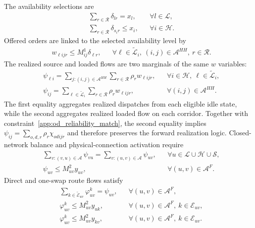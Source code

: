 \documentclass[final,3p,authoryear]{elsarticle}
\begin{document}
The availability selections are
\begin{align}
&
\sum_{r\in\mathcal R}\delta_{l r}
=x_l,
&&\forall l\in\mathcal L,
\label{app:availability_base}
\\
&
\sum_{r\in\mathcal R}\delta_{s_i r}
\le x_i,
&&\forall i\in\mathcal H.
\label{app:availability_virtual}
\end{align}
Offered orders are linked to the selected availability level by
\begin{align}
&
w_{\ell i j r}
\le M^1_{ij}\delta_{\ell r},
&&\forall \ell\in\widetilde{\mathcal L}_{i},\
(i,j)\in\mathcal A^{HH},\
r\in\mathcal R.
\label{app:w_reliability}
\end{align}
The realized source and loaded flows are two marginals of the same $w$ variables:
\begin{subequations}
\label{app:realized_flow_definitions}
\begin{align}
&
\psi_{\ell i}
=
\sum_{j:(i,j)\in\mathcal A^{HH}}
\sum_{r\in\mathcal R}
\rho_r w_{\ell i j r},
&&\forall i\in\mathcal H,\ \ell\in\widetilde{\mathcal L}_{i},
\label{app:source_flow}
\\
&
\psi_{ij}
=
\sum_{\ell\in\widetilde{\mathcal L}_{i}}
\sum_{r\in\mathcal R}
\rho_r w_{\ell i j r},
&&\forall(i,j)\in\mathcal A^{HH}.
\label{app:loaded_flow}
\end{align}
\end{subequations}
The first equality aggregates realized dispatches from each eligible idle state, while the second aggregates realized loaded flow on each corridor.
Together with constraint~\eqref{app:od_reliability_match}, the second equality implies $\psi_{ij}=\sum_{o,d,r}\rho_r\chi_{odijr}$ and therefore preserves the forward realization logic.
Closed-network balance and physical-connection activation require
\begin{align}
&
\sum_{v:(v,u)\in\mathcal A}\psi_{vu}
=
\sum_{v:(u,v)\in\mathcal A}\psi_{uv},
&&\forall u\in\mathcal L\cup\mathcal H\cup\mathcal S,
\label{app:flow_balance}
\\
&
\psi_{uv}
\le M^2_{uv}y_{uv},
&&\forall(u,v)\in\mathcal A^{F}.
\label{app:physical_flow}
\end{align}
Direct and one-swap route flows satisfy
\begin{align}
&
\sum_{k\in\widetilde{\mathcal E}_{uv}}
\varphi_{uv}^{k}
=\psi_{uv},
&&\forall(u,v)\in\mathcal A^{F},
\label{app:route_decomposition}
\\
&
\varphi_{uv}^{k}
\le M^2_{uv}y_{uk},
&&\forall(u,v)\in\mathcal A^{F},\
k\in\mathcal E_{uv},
\label{app:route_swap_in}
\\
&
\varphi_{uv}^{k}
\le M^2_{uv}y_{kv},
&&\forall(u,v)\in\mathcal A^{F},\
k\in\mathcal E_{uv}.
\label{app:route_swap_out}
\end{align}
\end{document}
